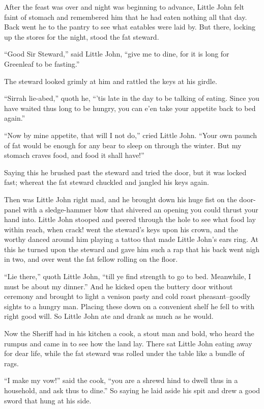 After the feast was over and night was beginning to advance, Little John
felt faint of stomach and remembered him that he had eaten nothing all
that day. Back went he to the pantry to see what eatables were laid by.
But there, locking up the stores for the night, stood the fat steward.

``Good Sir Steward,'' said Little John, ``give me to dine, for it is
long for Greenleaf to be fasting.''

The steward looked grimly at him and rattled the keys at his girdle.

``Sirrah lie-abed,'' quoth he, ``'tis late in the day to be talking of
eating. Since you have waited thus long to be hungry, you can e'en take
your appetite back to bed again.''

``Now by mine appetite, that will I not do,'' cried Little John. ``Your
own paunch of fat would be enough for any bear to sleep on through the
winter. But my stomach craves food, and food it shall have!''

Saying this he brushed past the steward and tried the door, but it was
locked fast; whereat the fat steward chuckled and jangled his keys
again.

Then was Little John right mad, and he brought down his huge fist on the
door-panel with a sledge-hammer blow that shivered an opening you could
thrust your hand into. Little John stooped and peered through the hole
to see what food lay within reach, when crack! went the steward's keys
upon his crown, and the worthy danced around him playing a tattoo that
made Little John's ears ring. At this he turned upon the steward and
gave him such a rap that his back went nigh in two, and over went the
fat fellow rolling on the floor.

``Lie there,'' quoth Little John, ``till ye find strength to go to bed.
Meanwhile, I must be about my dinner.'' And he kicked open the buttery
door without ceremony and brought to light a venison pasty and cold
roast pheasant--goodly sights to a hungry man. Placing these down on a
convenient shelf he fell to with right good will. So Little John ate and
drank as much as he would.

Now the Sheriff had in his kitchen a cook, a stout man and bold, who
heard the rumpus and came in to see how the land lay. There sat Little
John eating away for dear life, while the fat steward was rolled under
the table like a bundle of rags.

``I make my vow!'' said the cook, ``you are a shrewd hind to dwell thus
in a household, and ask thus to dine.'' So saying he laid aside his spit
and drew a good sword that hung at his side.

